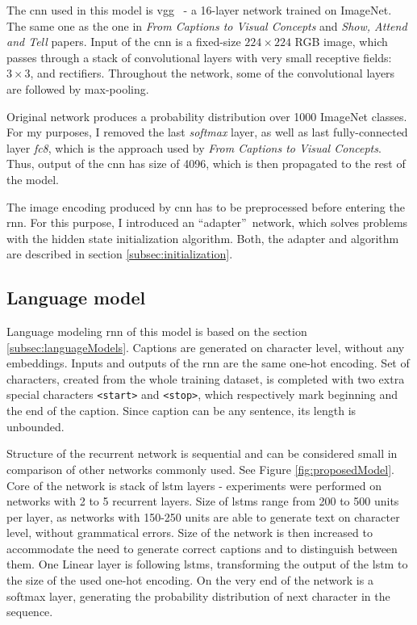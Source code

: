 The \gls{cnn} used in this model is \gls{vgg}~\cite{DBLP:journals/corr/SimonyanZ14a} - a 16-layer network trained on ImageNet. The same one as the one in \emph{From Captions to Visual Concepts} and \emph{Show, Attend and Tell} papers. Input of the \gls{cnn} is a fixed-size $ 224 \times 224 $ RGB image, which passes through a stack of convolutional layers with very small receptive fields: $ 3 \times 3 $, and rectifiers. Throughout the network, some of the convolutional layers are followed by max-pooling. 

Original network produces a probability distribution over 1000 ImageNet classes. For my purposes, I removed the last \emph{softmax} layer, as well as last fully-connected layer \emph{fc8}, which is the approach used by \emph{From Captions to Visual Concepts}. Thus, output of the \gls{cnn} has size of 4096, which is then propagated to the rest of the model.

The image encoding produced by \gls{cnn} has to be preprocessed before entering the \gls{rnn}. For this purpose, I introduced an \textquotedblleft adapter\textquotedblright\ network, which solves problems with the hidden state initialization algorithm. Both, the adapter and algorithm are described in section \ref{subsec:initialization}.

\subsection{Language model} \label{subsec:designLangMod}

Language modeling \gls{rnn} of this model is based on the section \ref{subsec:languageModels}. Captions are generated on character level, without any embeddings. Inputs and outputs of the \gls{rnn} are the same one-hot encoding. Set of characters, created from the whole training dataset, is completed with two extra special characters \texttt{<start>} and \texttt{<stop>}, which respectively mark beginning and the end of the caption. Since caption can be any sentence, its length is unbounded.

Structure of the recurrent network is sequential and can be considered small in comparison of other networks commonly used. See Figure \ref{fig:proposedModel}. Core of the network is stack of \gls{lstm} layers - experiments were performed on networks with 2 to 5 recurrent layers. Size of \gls{lstm}s range from 200 to 500 units per layer, as networks with 150-250 units are able to generate text on character level, without grammatical errors. Size of the network is then increased to accommodate the need to generate correct captions and to distinguish between them. One Linear layer is following \gls{lstm}s, transforming the output of the \gls{lstm} to the size of the used one-hot encoding. On the very end of the network is a softmax layer, generating the probability distribution of next character in the sequence.

